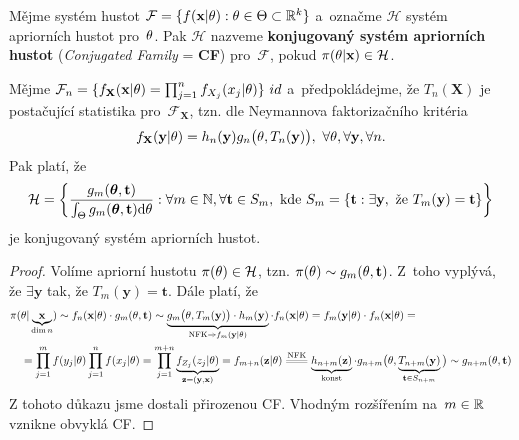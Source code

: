 \begin{define}
	Mějme systém hustot $\mathcal{F}=\{f(\textbf{x}|\theta):\theta\in\Theta\subset\mathbb{R}^k\}$ a~označme $\mathcal{H}$ systém apriorních hustot pro~$\theta$. Pak $\mathcal{H}$ nazveme \textbf{konjugovaný systém apriorních hustot} (\textit{Conjugated Family} = \textbf{CF}) pro~$\mathcal{F}$, pokud $\pi(\theta|\textbf{x})\in\mathcal{H}$.
\end{define}
\begin{theorem}
	Mějme $\mathcal{F}_n=\{f_{\textbf{X}}(\textbf{x}|\theta)=\prod_{j=1}^n f_{X_j}(x_j|\theta)\} ~id$ a~předpokládejme, že $T_n(\textbf{X})$ je postačující statistika pro~$\mathcal{F}_\textbf{X}$, tzn. dle Neymannova faktorizačního kritéria $$f_{\textbf{X}}(\textbf{y}|\theta)=h_n(\textbf{y})g_n\big(\theta,T_n(\textbf{y})\big),~\forall\theta,\forall\textbf{y},\forall n.$$ Pak platí, že $$\mathcal{H}=\bigg\{\frac{g_m(\boldsymbol{\theta},\textbf{t})}{\int_{\Theta} g_m(\boldsymbol{\theta},\textbf{t})\mathrm{d}\theta}:\forall m\in\mathbb{N},\forall\textbf{t}\in S_m,\text{ kde }S_m=\{\textbf{t}:\exists\textbf{y},\text{ že }T_m(\textbf{y})=\textbf{t}\}\bigg\}$$
	je konjugovaný systém apriorních hustot.
	\begin{proof}
		Volíme apriorní hustotu $\pi(\theta)\in\mathcal{H}$, tzn. $\pi(\theta)\sim g_m(\theta,\textbf{t})$. Z~toho vyplývá, že $\exists\textbf{y}$ tak, že $T_m(\textbf{y})=\textbf{t}$. Dále platí, že \[
		\begin{split}
		\pi(&\t|\underbrace{\textbf{x}}_{\dim n})\sim f_n(\textbf{x}|\t)\cdot g_m(\t,\textbf{t})\sim \underbrace{g_m\big(\t,T_m(\textbf{y})\big)\cdot h_m(\textbf{y})}_{\mathrm{NFK}\Rightarrow f_m(\textbf{y}|\t)}\cdot f_n(\textbf{x}|\t)=f_m(\textbf{y}|\t)\cdot f_n(\textbf{x}|\t)=\\&=\prod_{j=1}^mf(y_j|\t)\prod_{j=1}^nf(x_j|\t)=\prod_{j=1}^{m+n}\underbrace{f_{Z_j}(z_j|\t)}_{\textbf{z}=(\textbf{y},\textbf{x})}=f_{m+n}(\textbf{z}|\t)\equal{\text{NFK}}\underbrace{h_{n+m}(\textbf{z})}_{\text{konst}}\cdot g_{n+m}\big(\t,\underbrace{T_{n+m}(\textbf{y})}_{\textbf{t}\in S_{n+m}}\big)\sim g_{n+m}(\t,\textbf{t})
		\end{split}
		\]
		Z tohoto důkazu jsme dostali přirozenou CF. Vhodným rozšířením na~$m\in\mathbb{R}$ vznikne obvyklá CF.
	\end{proof}
\end{theorem}
